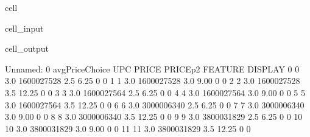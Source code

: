 \documentclass[letterpaper,10pt,english]{jupyterBook}
\begin{document}
\begin{sphinxuseclass}{cell}\begin{sphinxVerbatimInput}

\begin{sphinxuseclass}{cell_input}
\begin{sphinxVerbatim}[commandchars=\\\{\}]
  

  

\end{sphinxVerbatim}

\end{sphinxuseclass}\end{sphinxVerbatimInput}
\begin{sphinxVerbatimOutput}

\begin{sphinxuseclass}{cell_output}
\begin{sphinxVerbatim}[commandchars=\\\{\}]
    Unnamed: 0  avgPriceChoice         UPC  PRICE  PRICE\PYGZus{}p2  FEATURE  DISPLAY  \PYGZbs{}
0            0             3.0  1600027528    2.5      6.25        0        0   
1            1             3.0  1600027528    3.0      9.00        0        0   
2            2             3.0  1600027528    3.5     12.25        0        0   
3            3             3.0  1600027564    2.5      6.25        0        0   
4            4             3.0  1600027564    3.0      9.00        0        0   
5            5             3.0  1600027564    3.5     12.25        0        0   
6            6             3.0  3000006340    2.5      6.25        0        0   
7            7             3.0  3000006340    3.0      9.00        0        0   
8            8             3.0  3000006340    3.5     12.25        0        0   
9            9             3.0  3800031829    2.5      6.25        0        0   
10          10             3.0  3800031829    3.0      9.00        0        0   
11          11             3.0  3800031829    3.5     12.25        0        0   


\end{sphinxVerbatim}
\end{sphinxuseclass}
\end{sphinxVerbatimOutput}
\end{sphinxuseclass}
\end{document}
